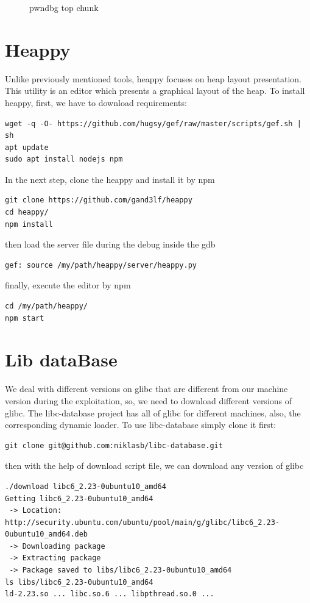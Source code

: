 \documentclass{masterthesis}
\newcommand*\libc{glibc}
\begin{document}
\begin{figure}[h!]
\caption{pwndbg top chunk}
\label{fig:pwntopchunk}
\end{figure}


\section{Heappy}
Unlike previously mentioned tools, heappy focuses on heap layout presentation. This utility is an editor which presents a graphical layout of the heap. To install heappy, first, we have to download requirements:

\begin{lstlisting}[frame=tlrb]
wget -q -O- https://github.com/hugsy/gef/raw/master/scripts/gef.sh | sh
apt update
sudo apt install nodejs npm
\end{lstlisting}

In the next step, clone the heappy and install it by npm

\begin{lstlisting}[frame=tlrb]
git clone https://github.com/gand3lf/heappy
cd heappy/
npm install
\end{lstlisting}

then load the server file during the debug inside the gdb
\begin{lstlisting}[frame=tlrb]
gef: source /my/path/heappy/server/heappy.py
\end{lstlisting}

finally, execute the editor by npm

\begin{lstlisting}[frame=tlrb]
cd /my/path/heappy/
npm start
\end{lstlisting}


\section{Lib dataBase}
We deal with different versions on \libc{} that are different from our machine version during the exploitation, so, we need to download different versions of \libc{}. The libc-database project has all of \libc{} for different machines, also, the corresponding dynamic loader. To use libc-database simply clone it first:
\begin{lstlisting}[frame=tlrb]
git clone git@github.com:niklasb/libc-database.git
\end{lstlisting}
then with the help of download script file, we can download any version of \libc{}
\begin{lstlisting}[frame=tlrb]
./download libc6_2.23-0ubuntu10_amd64
Getting libc6_2.23-0ubuntu10_amd64
 -> Location: http://security.ubuntu.com/ubuntu/pool/main/g/glibc/libc6_2.23-0ubuntu10_amd64.deb
 -> Downloading package
 -> Extracting package
 -> Package saved to libs/libc6_2.23-0ubuntu10_amd64
ls libs/libc6_2.23-0ubuntu10_amd64
ld-2.23.so ... libc.so.6 ... libpthread.so.0 ...
\end{lstlisting}
\end{document}
